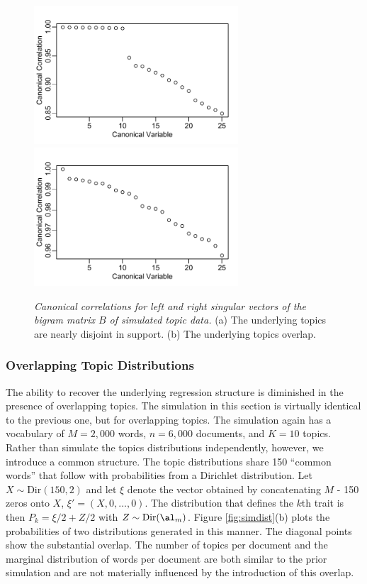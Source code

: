\documentclass[12pt]{article}
\begin{document}
 \begin{figure}
  \caption{ \label{fig:simccab} { \sl Canonical correlations for left and right
 singular vectors of the bigram matrix $B$ of simulated topic data.} (a) The underlying topics are nearly disjoint in support. (b) The underlying topics overlap.}
\vspace{0.1in}
 \centerline{
      \includegraphics[width=3in]{figures/simccab}  
      \includegraphics[width=3in]{figures/simccabb}   }
  \end{figure}
 
 
 \subsubsection{Overlapping Topic Distributions} %
 
 The ability to recover the underlying regression structure is diminished in the presence of overlapping topics.  The simulation in this section is virtually identical to the previous one, but for overlapping topics.  The simulation again has a vocabulary of $M=2,000$ words, $n=6,000$ documents, and $K=10$ topics.  Rather than simulate the topics distributions independently, however, we introduce a common structure.  The topic distributions share 150 ``common words'' that follow with probabilities from a Dirichlet distribution.  Let $X \sim \mbox{Dir}(150, 2)$ and let $\xi$ denote the vector obtained by concatenating $M$ - 150 zeros onto $X$, $\xi' = (X, 0 , \ldots, 0)$.  The distribution that defines the $k$th trait is then $P_k = \xi/2 + Z/2$ with $Z \sim \mbox{Dir}(\al_m)$.  Figure \ref{fig:simdist}(b) plots the probabilities of two distributions generated in this manner.  The diagonal points show the substantial overlap.  The number of topics per document and the marginal distribution of words per document are both similar to the prior simulation and are not materially influenced by the introduction of this overlap.
 
\end{document}
